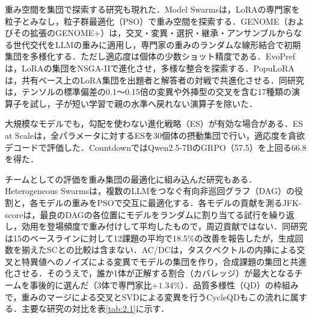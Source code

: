重み空間を集団で探索する研究も現れた．Model Swarms\cite{feng2024model}は，LoRAの専門家を粒子とみなし，粒子群最適化（PSO）で重み空間を探索する．GENOME（およびその拡張のGENOME+）\cite{zhang2025genome}は，交叉・変異・選択・継承・アンサンブルからなる世代交代をLLMの重みに適用し，専門家の重みのランダムな線形結合で初期集団を多様化する．ただし適応度は個体の少数ショット精度である．EvoPref\cite{evopref2026evolutionary}は，LoRAの集団をNSGA-IIで進化させ，多様な整合を探索する．PopuLoRA\cite{creuscastanyer2026populora}は，共有ベース上のLoRA集団を出題者と解答者の対戦で共進化させる．同研究は，テンソルの標準偏差の0.1〜0.15倍の変異や外挿型の交叉を含む17種類の演算子を試し，子が短い学習で親の水準へ戻れない演算子を除いた．

大規模なモデルでも，勾配を使わない進化戦略（ES）が有効な場合がある．ES at Scale\cite{qiu2026es}は，全パラメータに対するESを30個体の摂動集団で行い，適応度を貪欲デコードで評価した．CountdownではQwen2.5-7BのGRPO（57.5）を上回る66.8を得た．

チームとしての評価を重み集団の最適化に組み込んだ研究もある．Heterogeneous Swarms\cite{feng2025heterogeneous}は，複数のLLMをつなぐ有向非巡回グラフ（DAG）の役割と，各モデルの重みをPSOで交互に最適化する．各モデルの貢献を測るJFK-scoreは，最良のDAGの各位置にモデルをランダムに割り当てる試行を繰り返し，効用を登場頻度で重み付けして平均したもので，周辺貢献ではない．同研究は15のベースラインに対して12課題の平均で18.5\%の改善を報告したが，生成回数を揃えたSCとの比較は含まない．AC/DC\cite{dai2026acdc}は，タスクベクトルの内挿による交叉と特異値へのノイズによる変異でモデルの集団を作り，合成課題の集団と共進化させる．そのうえで，誰か1体が正解する割合（カバレッジ）が最大となるチームを事後的に選んだ（3体で専門家比$+1.34$\%）．品質多様性（QD）\cite{mouret2015illuminating}の枠組みで，重みのマージによる交叉とSVDによる変異を行うCycleQD\cite{kuroki2025cycleqd}もこの流れに属する．主要な研究の対比を表\ref{tab:2.1}に示す．

